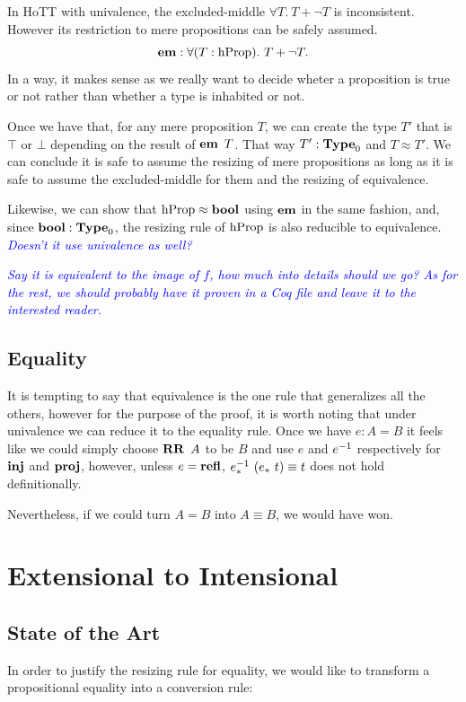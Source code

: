 \documentclass[11pt]{article}
\theoremstyle{plain}
\theoremstyle{remark}
\newcommand\meta[1]{\noindent\textcolor{blue}{\emph{#1}}}
\begin{document}
In HoTT with univalence, the excluded-middle $\forall T.\ T + \neg T$ is
inconsistent. However its restriction to mere propositions can be safely
assumed.
\[\emd : \forall (T:\hProp).\ T + \neg T.\]
In a way, it makes sense as we really want to decide wheter a proposition is
true or not rather than whether a type is inhabited or not.

Once we have that, for any mere proposition $T$, we can create the type $T'$
that is $\top$ or $\bot$ depending on the result of $\operatorname{\mathbf{em}}\ T$.
That way $T' : \operatorname{\mathbf{Type}}_0$ and $T \approx T'$.
We can conclude it is safe to assume the resizing of mere propositions as long
as it is safe to assume the excluded-middle for them and the resizing of
equivalence.

Likewise, we can show that $\operatorname{hProp} \approx \operatorname{\mathbf{bool}}$ using $\operatorname{\mathbf{em}}$ in the same
fashion, and, since $\operatorname{\mathbf{bool}} : \operatorname{\mathbf{Type}}_0$, the resizing rule of $\operatorname{hProp}$ is also
reducible to equivalence.
\meta{Doesn't it use univalence as well?}

\meta{Say it is equivalent to the image of $f$, how much into details should we
go? As for the rest, we should probably have it proven in a Coq file and leave
it to the interested reader.}

\subsection{Equality}
It is tempting to say that equivalence is the one rule that generalizes all the
others, however for the purpose of the proof, it is worth noting that under
univalence we can reduce it to the equality rule.
Once we have $e : A = B$ it feels like we could simply choose $\RR\ A$ to be
$B$ and use $e$ and $e^{-1}$ respectively for $\operatorname{\mathbf{inj}}$ and $\operatorname{\mathbf{proj}}$,
however, unless $e = \operatorname{\mathbf{refl}}$, $e^{-1}_*\ (e_*\ t) \equiv t$ does not hold
definitionally.

Nevertheless, if we could turn $A = B$ into $A \equiv B$, we would have won.

\section{Extensional to Intensional}

\subsection{State of the Art}

In order to justify the resizing rule for equality, we would like to transform
a propositional equality into a conversion rule:
\end{document}

